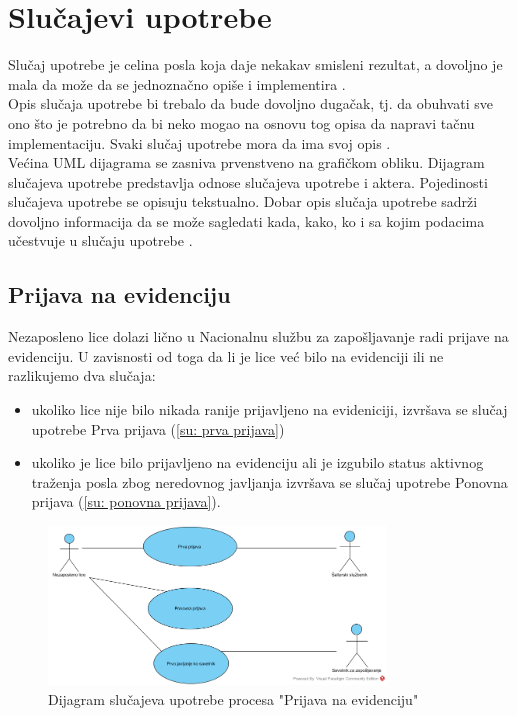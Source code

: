 \section{Slu\v cajevi upotrebe}

Slu\v caj upotrebe je celina posla koja daje nekakav smisleni rezultat, a dovoljno je mala da mo\v ze da se jednozna\v cno opi\v se i implementira \cite{smalkov-slajdovi}.\\

Opis slu\v caja upotrebe bi trebalo da bude dovoljno duga\v cak, tj. da obuhvati sve ono \v sto je potrebno da bi neko mogao na osnovu tog opisa da napravi ta\v cnu implementaciju. Svaki slu\v caj upotrebe mora da ima svoj opis \cite{smalkov-slajdovi}.\\

Ve\' cina UML dijagrama se zasniva prvenstveno na grafi\v ckom obliku. Dijagram slu\v cajeva upotrebe predstavlja odnose slu\v cajeva upotrebe i aktera. Pojedinosti slu\v cajeva upotrebe se opisuju tekstualno. Dobar opis slu\v caja upotrebe sadr\v zi dovoljno informacija da se mo\v ze sagledati kada, kako, ko i sa kojim podacima u\v cestvuje u slu\v caju upotrebe \cite{smalkov-slajdovi}.

\subsection{Prijava na evidenciju}

Nezaposleno lice dolazi li\v cno u Nacionalnu slu\v zbu za zapo\v sljavanje radi prijave na evidenciju. U zavisnosti od toga da li je lice ve\' c bilo na evidenciji ili ne razlikujemo dva slu\v caja:

\begin{itemize}
	\item ukoliko lice nije bilo nikada ranije prijavljeno na evideniciji, izvr\v sava se slu\v caj upotrebe Prva prijava (\ref{su: prva prijava})
	\item ukoliko je lice bilo prijavljeno na evidenciju ali je izgubilo status aktivnog tra\v zenja posla zbog neredovnog javljanja izvr\v sava se slu\v caj upotrebe Ponovna prijava (\ref{su: ponovna prijava}).
\end{itemize}

\begin{figure}[H]
	\centering
	\includegraphics[width=0.8\textwidth]{dijagrami/dijagrami-slucajeva-upotrebe/prijava-na-evidenciju.png}
	\caption{Dijagram slu\v cajeva upotrebe procesa "Prijava na evidenciju"}
	\label{dsu: prijava na evidenciju}
\end{figure}

